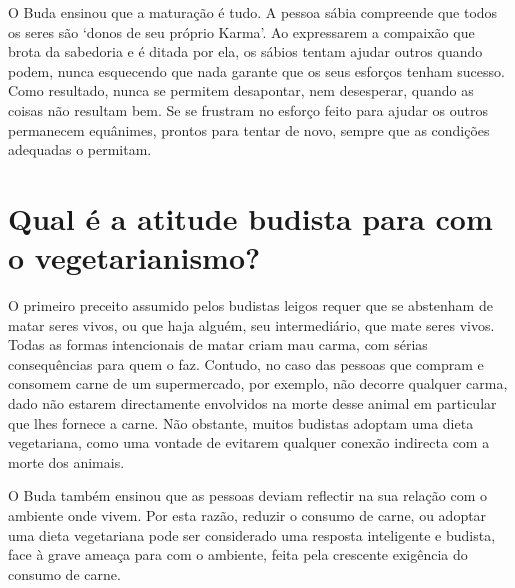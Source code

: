 O Buda ensinou que a maturação é tudo. A pessoa sábia compreende que
todos os seres são `donos de seu próprio Karma'. Ao expressarem a
compaixão que brota da sabedoria e é ditada por ela, os sábios tentam
ajudar outros quando podem, nunca esquecendo que nada garante que os
seus esforços tenham sucesso. Como resultado, nunca se permitem
desapontar, nem desesperar, quando as coisas não resultam bem. Se se
frustram no esforço feito para ajudar os outros permanecem equânimes,
prontos para tentar de novo, sempre que as condições adequadas o
permitam.

\section{Qual é a atitude budista para com o vegetarianismo?}

O primeiro preceito assumido pelos budistas leigos requer que se
abstenham de matar seres vivos, ou que haja alguém, seu intermediário,
que mate seres vivos. Todas as formas intencionais de matar criam mau
carma, com sérias consequências para quem o faz. Contudo, no caso das
pessoas que compram e consomem carne de um supermercado, por exemplo,
não decorre qualquer carma, dado não estarem directamente envolvidos na
morte desse animal em particular que lhes fornece a carne. Não obstante,
muitos budistas adoptam uma dieta vegetariana, como uma vontade de
evitarem qualquer conexão indirecta com a morte dos animais.

O Buda também ensinou que as pessoas deviam reflectir na sua relação com
o ambiente onde vivem. Por esta razão, reduzir o consumo de carne, ou
adoptar uma dieta vegetariana pode ser considerado uma resposta
inteligente e budista, face à grave ameaça para com o ambiente, feita
pela crescente exigência do consumo de carne.
